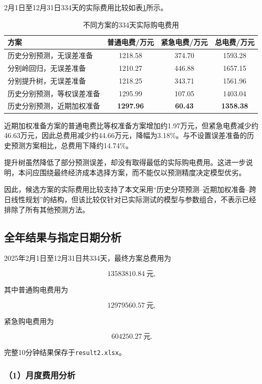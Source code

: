 2月1日至12月31日334天的实际费用比较如表\ref{tab:q2_model_compare}所示。

\begin{table}[htbp]
\centering
\caption{不同方案的334天实际购电费用}
\label{tab:q2_model_compare}
\begin{tabular}{lccc}
\hline
方案 & 普通电费/万元 & 紧急电费/万元 & 总电费/万元 \\
\hline
历史分别预测，无误差准备
& 1218.58 & 374.70 & 1593.28 \\
分别岭回归，无误差准备
& 1210.27 & 446.88 & 1657.15 \\
分别提升树，无误差准备
& 1218.25 & 343.71 & 1561.96 \\
历史分别预测，等权误差准备
& 1295.99 & 107.05 & 1403.04 \\
历史分别预测，近期加权准备
& \textbf{1297.96} & \textbf{60.43} & \textbf{1358.38} \\
\hline
\end{tabular}
\end{table}

近期加权准备方案的普通电费比等权准备方案增加约1.97万元，但紧急电费减少约46.63万元，因此总费用减少约44.66万元，降幅为3.18\%。与不设置误差准备的历史预测方案相比，总费用下降约14.74\%。

提升树虽然降低了部分预测误差，却没有取得最低的实际购电费用。这进一步说明，本问应围绕最终经济成本选择方案，而不能仅以预测精度决定模型优劣。

因此，候选方案的实际费用比较支持了本文采用“历史分项预测--近期加权准备--跨日线性规划”的结构，但该比较仅针对已实际测试的模型与参数组合，不表示已经排除了所有其他预测方法。


\subsection{全年结果与指定日期分析}

2025年2月1日至12月31日共334天，最终方案总费用为

\[
\boxed{13583810.84\ \text{元}},
\]

其中普通购电费用为

\[
12979560.57\ \text{元},
\]

紧急购电费用为

\[
604250.27\ \text{元}.
\]

完整10分钟结果保存于\texttt{result2.xlsx}。


\subsubsection*{（1）月度费用分析}

